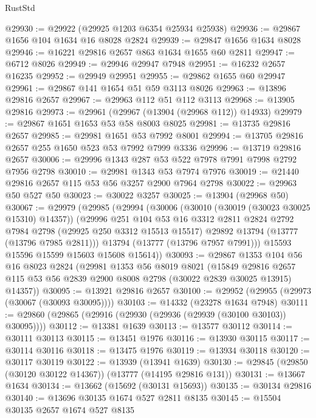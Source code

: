 \begin{lexlean}{RustStd}
\begin{coremodule}
@29930 := @29922 (@29925 @1203 @6354 @25934 @25938)
@29936 := @29867 @1656 @104 @1634 @16 @8028 @2824
@29939 := @29847 @1656 @1634 @8028
@29946 := @16221 @29816 @2657 @863 @1634 @1655 @60 @2811
@29947 := @6712 @8026
@29949 := @29946 @29947 @7948
@29951 := @16232 @2657 @16235
@29952 := @29949 @29951
@29955 := @29862 @1655 @60 @29947
@29961 := @29867 @141 @1654 @51 @59 @3113 @8026
@29963 := @13896 @29816 @2657
@29967 := @29963 @112 @51 @112 @3113
@29968 := @13905 @29816
@29973 := @29961 (@29967 (@13904 (@29968 @112)) @14933)
@29979 := @29867 @1651 @1653 @53 @58 @8003 @8025
@29981 := @13735 @29816 @2657
@29985 := @29981 @1651 @53 @7992 @8001
@29994 := @13705 @29816 @2657 @255 @1650 @523 @53 @7992 @7999 @3336
@29996 := @13719 @29816 @2657
@30006 := @29996 @1343 @287 @53 @522 @7978 @7991 @7998 @2792 @7956 @2798
@30010 := @29981 @1343 @53 @7974 @7976
@30019 := @21440 @29816 @2657 @115 @53 @56 @3257 @2900 @7964 @2798
@30022 := @29963 @50 @527 @50
@30023 := @30022 @3257
@30025 := @13904 (@29968 @50)
@30067 := @29979
    (@29985
      (@29994
        (@30006
          (@30010 (@30019 (@30023 @30025 @15310) @14357))
          (@29996
            @251
            @104
            @53
            @16
            @3312
            @2811
            @2824
            @2792
            @7984
            @2798
            (@29925 @250 @3312 @15513 @15517)
            @29892
            @13794
            (@13777 (@13796 @7985 @2811)))
          @13794
          (@13777 (@13796 @7957 @7991)))
        @15593
        @15596
        @15599
        @15603
        @15608
        @15614))
@30093 := @29867
    @1353
    @104
    @56
    @16
    @8023
    @2824
    (@29981
      @1353
      @56
      @8019
      @8021
      (@15849
        @29816
        @2657
        @115
        @53
        @56
        @2839
        @2900
        @8008
        @2798
        (@30022 @2839 @30025 @13915)
        @14357))
@30095 := @13921 @29816 @2657
@30100 := @29952 (@29955 (@29973 (@30067 (@30093 @30095))))
@30103 := @14332 (@23278 @1634 @7948)
@30111 := @29860 (@29865 (@29916 (@29930 (@29936 (@29939 (@30100 @30103)) @30095))))
@30112 := @13381 @1639
@30113 := @13577 @30112
@30114 := @30111 @30113
@30115 := @13451 @1976
@30116 := @13930 @30115
@30117 := @30114 @30116
@30118 := @13475 @1976
@30119 := @13934 @30118
@30120 := @30117 @30119
@30122 := @13939 (@13941 @1639)
@30130 := @29845 (@29850 (@30120 @30122 @14367)) (@13777 (@14195 @29816 @131))
@30131 := @13667 @1634
@30134 := @13662 (@15692 (@30131 @15693))
@30135 := @30134 @29816
@30140 := @13696 @30135 @1674 @527 @2811 @8135
@30145 := @15504 @30135 @2657 @1674 @527 @8135

\end{coremodule}
\end{lexlean}
